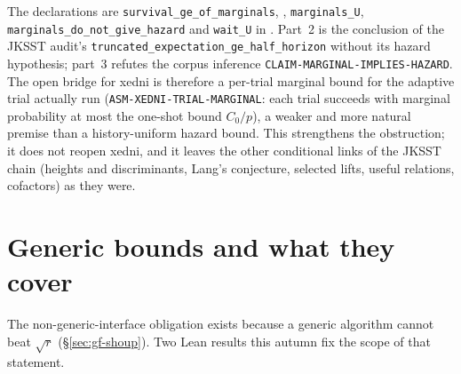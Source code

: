 The declarations are \texttt{survival\_ge\_of\_marginals},
,
\texttt{marginals\_U}, \texttt{marginals\_do\_not\_give\_hazard} and
\texttt{wait\_U} in
.
Part~2 is the conclusion of the JKSST audit's
\texttt{truncated\_expectation\_ge\_half\_horizon} without its hazard
hypothesis; part~3 refutes the corpus inference
\texttt{CLAIM-MARGINAL-IMPLIES-HAZARD}. The open bridge for xedni is
therefore a per-trial marginal bound for the adaptive trial actually run
(\texttt{ASM-XEDNI-TRIAL-MARGINAL}: each trial succeeds with marginal
probability at most the one-shot bound $C_0/p$), a weaker and more natural
premise than a history-uniform hazard bound. This strengthens the
obstruction; it does not reopen xedni, and it leaves the other conditional
links of the JKSST chain (heights and discriminants, Lang's conjecture,
selected lifts, useful relations, cofactors) as they were.

\section{Generic bounds and what they cover}\label{sec:hd-generic}

The non-generic-interface obligation exists because a generic algorithm
cannot beat $\sqrt r$ (\S\ref{sec:gf-shoup}). Two Lean results this autumn
fix the scope of that statement.

